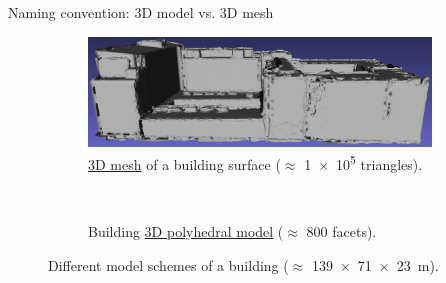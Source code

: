 \documentclass[10pt, export]{beamer}
\begin{document}
        \begin{frame}{Naming convention: 3D model vs. 3D mesh}
            \begin{figure}
                \begin{center}
                    \begin{subfigure}{\textwidth}
                        \begin{center}
                            \includegraphics[height=.28\textheight]{images/difference_mesh_model/bercy_building_mesh_1_e5}
                            \caption{\underline{3D mesh} of a building surface ($\approx$ \num[output-exponent-marker = \text{e}]{1e5} triangles).}
                        \end{center}
                    \end{subfigure}
                    \\
                    \begin{subfigure}{\textwidth}
                        \begin{center}
                            
                            \caption{Building \underline{3D polyhedral model} ($\approx$ 800 facets).}
                        \end{center}
                    \end{subfigure}
                    \caption{Different model schemes of a building ($\approx$ \SI{139 x 71 x 23}{\metre}).}
                \end{center}
            \end{figure}
        \end{frame}
\end{document}
